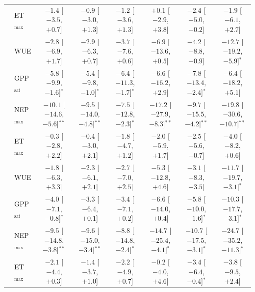 \begin{table}[p]
{\begin{tabular}{llcccccc}
 & ET$_\mathrm{max}$ & $-1.4$ {\tiny[$-3.5$, $+0.7$]} & $-0.9$ {\tiny[$-3.0$, $+1.3$]} & $-1.2$ {\tiny[$-3.6$, $+1.3$]} & $+0.1$ {\tiny[$-2.9$, $+3.8$]} & $-2.4$ {\tiny[$-5.0$, $+0.2$]} & $-1.9$ {\tiny[$-6.1$, $+2.7$]} \\
 & WUE & $-2.8$ {\tiny[$-6.9$, $+1.7$]} & $-2.9$ {\tiny[$-6.3$, $+0.7$]} & $-3.7$ {\tiny[$-7.6$, $+0.6$]} & $-6.9$ {\tiny[$-13.6$, $+0.5$]} & $-4.2$ {\tiny[$-8.8$, $+0.9$]} & $-12.7$ {\tiny[$-19.2$, $-5.9$]}$^{*}$ \\
\midrule
{} & GPP$_\mathrm{sat}$ & $-5.8$ {\tiny[$-9.9$, $-1.6$]}$^{*}$ & $-5.4$ {\tiny[$-9.8$, $-1.0$]}$^{*}$ & $-6.4$ {\tiny[$-11.3$, $-1.7$]}$^{*}$ & $-6.6$ {\tiny[$-16.2$, $+2.9$]} & $-7.8$ {\tiny[$-13.4$, $-2.4$]}$^{*}$ & $-6.4$ {\tiny[$-18.2$, $+5.1$]} \\
 & NEP$_\mathrm{max}$ & $-10.1$ {\tiny[$-14.6$, $-5.6$]}$^{**}$ & $-9.5$ {\tiny[$-14.0$, $-4.8$]}$^{**}$ & $-7.5$ {\tiny[$-12.8$, $-2.3$]}$^{*}$ & $-17.2$ {\tiny[$-27.9$, $-8.3$]}$^{**}$ & $-9.7$ {\tiny[$-15.5$, $-4.2$]}$^{**}$ & $-19.8$ {\tiny[$-30.6$, $-10.7$]}$^{**}$ \\
 & ET$_\mathrm{max}$ & $-0.3$ {\tiny[$-2.8$, $+2.2$]} & $-0.4$ {\tiny[$-3.0$, $+2.1$]} & $-1.8$ {\tiny[$-4.7$, $+1.2$]} & $-2.0$ {\tiny[$-5.9$, $+1.7$]} & $-2.5$ {\tiny[$-5.6$, $+0.7$]} & $-4.0$ {\tiny[$-8.2$, $+0.6$]} \\
 & WUE & $-1.8$ {\tiny[$-6.3$, $+3.3$]} & $-2.3$ {\tiny[$-6.1$, $+2.1$]} & $-2.7$ {\tiny[$-7.0$, $+2.5$]} & $-5.3$ {\tiny[$-12.8$, $+4.6$]} & $-3.1$ {\tiny[$-8.3$, $+3.5$]} & $-11.7$ {\tiny[$-19.7$, $-3.1$]}$^{*}$ \\
\midrule
{} & GPP$_\mathrm{sat}$ & $-4.0$ {\tiny[$-7.1$, $-0.8$]}$^{*}$ & $-3.3$ {\tiny[$-6.4$, $+0.1$]} & $-3.4$ {\tiny[$-7.1$, $+0.2$]} & $-6.6$ {\tiny[$-14.0$, $+0.4$]} & $-5.8$ {\tiny[$-10.0$, $-1.6$]}$^{*}$ & $-10.3$ {\tiny[$-17.7$, $-3.1$]}$^{*}$ \\
 & NEP$_\mathrm{max}$ & $-9.5$ {\tiny[$-14.8$, $-3.8$]}$^{**}$ & $-9.6$ {\tiny[$-15.0$, $-3.4$]}$^{**}$ & $-8.8$ {\tiny[$-14.8$, $-2.4$]}$^{*}$ & $-14.7$ {\tiny[$-25.4$, $-4.1$]}$^{*}$ & $-10.7$ {\tiny[$-17.5$, $-3.1$]}$^{*}$ & $-24.7$ {\tiny[$-35.2$, $-11.3$]}$^{*}$ \\
 & ET$_\mathrm{max}$ & $-2.1$ {\tiny[$-4.4$, $+0.3$]} & $-1.4$ {\tiny[$-3.7$, $+1.0$]} & $-2.2$ {\tiny[$-4.9$, $+0.7$]} & $-0.2$ {\tiny[$-4.0$, $+4.6$]} & $-3.4$ {\tiny[$-6.4$, $-0.4$]}$^{*}$ & $-3.8$ {\tiny[$-9.5$, $+2.4$]} \\

\end{tabular}}
\end{table}
